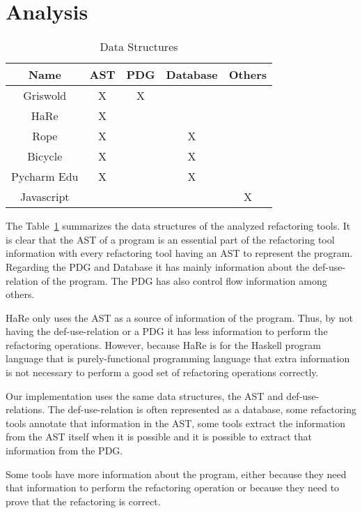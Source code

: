 \section{Analysis}
\begin{table}[]
\centering
\caption{Data Structures}
\label{tab:my-table}
\begin{tabular}{c|c|c|c|c}
Name       & AST & PDG & Database & Others \\ \hline
Griswold   & X   & X   &          &        \\ \hline
HaRe       & X   &     &          &        \\ \hline
Rope       & X   &     & X        &        \\ \hline
Bicycle    & X   &     & X        &        \\ \hline
Pycharm Edu & X   &     & X        &        \\ \hline
Javascript &     &     &          & X
\end{tabular}
\end{table}

The Table~\ref{tab:my-table} summarizes the data structures of the analyzed refactoring tools.
It is clear that the AST of a program is an essential part of the refactoring
tool information with every refactoring tool having an AST to represent the program.
Regarding the PDG and Database it has mainly information about the def-use-relation
of the program. The PDG has also control flow information among others.

HaRe only uses the AST as a source of information of the program. Thus, by not having
the def-use-relation or a PDG it has less information to perform the refactoring operations.
However, because HaRe is for the Haskell program language that is purely-functional
programming language that extra information is not necessary to perform a good set of
refactoring operations correctly.



Our implementation uses the same data structures, the AST and
def-use-relations. The def-use-relation is often represented as a database,
some refactoring tools annotate that information in the AST, %
some tools extract the information from the AST itself when it is possible and
it is possible to extract that information from the PDG.


Some tools have more information about the program, either because they need that
information to perform the refactoring operation or because they need to prove that
the refactoring is correct.  %

